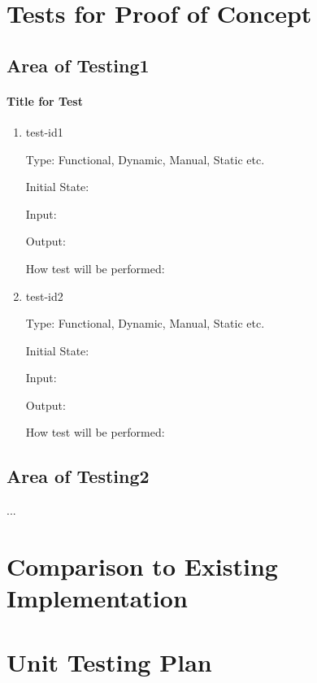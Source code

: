 \documentclass[12pt, titlepage]{article}
\begin{document}
\section{Tests for Proof of Concept}

\subsection{Area of Testing1}
        
\paragraph{Title for Test}

\begin{enumerate}

\item{test-id1\\}

Type: Functional, Dynamic, Manual, Static etc.
                    
Initial State: 
                    
Input: 
                    
Output: 
                    
How test will be performed: 
                    
\item{test-id2\\}

Type: Functional, Dynamic, Manual, Static etc.
                    
Initial State: 
                    
Input: 
                    
Output: 
                    
How test will be performed: 

\end{enumerate}

\subsection{Area of Testing2}

...

    
\section{Comparison to Existing Implementation} 
                
\section{Unit Testing Plan}
        
\end{document}

